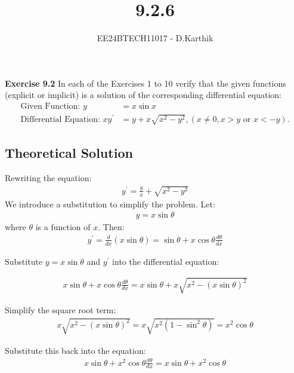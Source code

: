 \documentclass[journal]{IEEEtran}
\newcommand{\brak}[1]{\left( #1 \right)}
\begin{document}

\vspace{3cm}

\title{9.2.6}
\author{EE24BTECH11017 - D.Karthik}
{\let\newpage\relax\maketitle}
\renewcommand{\thefigure}{\theenumi}
\renewcommand{\thetable}{\theenumi}

\textbf{Exercise 9.2} In each of the Exercises 1 to 10 verify that the given functions (explicit or implicit) is a solution of the corresponding differential equation:
\begin{align}
    \text{Given Function: } y &= x \sin x\\
    \text{Differential Equation: } xy^{\prime} &= y + x\sqrt{x^2 - y^2},  \brak{x \neq 0, x > y \text{ or } x < -y}.
\end{align}

\subsection*{Theoretical Solution}

Rewriting the equation:
\begin{align}
y^{\prime} = \frac{y}{x} + \sqrt{x^2 - y^2}
\end{align}
We introduce a substitution to simplify the problem. Let:
\begin{align}
    y = x \sin \theta
\end{align}
where $\theta$ is a function of $x$. Then:
\begin{align}
    y^{\prime} = \frac{d}{dx}\brak{x \sin \theta} = \sin \theta + x \cos \theta \frac{d\theta}{dx}
    \end{align}

Substitute $y = x \sin \theta $ and $y^{\prime}$ into the differential equation:

\begin{align}
    x \sin\theta + x \cos\theta \frac{d\theta}{dx} = x \sin\theta + x \sqrt{x^2 - (x \sin\theta)^2}
\end{align}

Simplify the square root term:
\begin{align}
    x \sqrt{x^2 - (x \sin\theta)^2} = x \sqrt{x^2 (1 - \sin^2\theta)} = x^2 \cos\theta
\end{align}



Substitute this back into the equation:
\begin{align}
    x \sin\theta + x^2 \cos\theta \frac{d\theta}{dx} = x \sin\theta + x^2 \cos\theta
\end{align}
\end{document}
